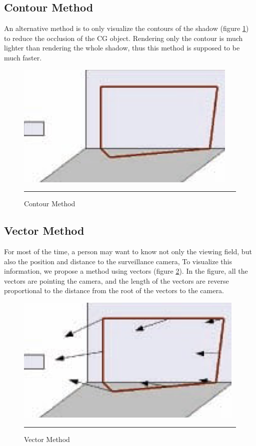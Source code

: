 \subsection{Contour Method}

An alternative method is to only visualize the contours of the shadow (figure \ref{fig:ContourMethod}) to reduce the occlusion of the CG object. Rendering only the contour is much lighter than rendering the whole shadow, thus this method is supposed to be much faster.

\begin{figure}[htbp]
	\centering
	\includegraphics{./Primitives/theory_contour.png}
	\rule{35em}{0.5pt}
	\caption[Contour Method]{Contour Method}
	\label{fig:ContourMethod}
\end{figure}

\subsection{Vector Method}

For most of the time, a person may want to know not only the viewing field, but also the position and distance to the surveillance camera, To visualize this information, we propose a method using vectors (figure \ref{fig:VectorMethod}). In the figure, all the vectors are pointing the camera, and the length of the vectors are reverse proportional to the distance from the root of the vectors to the camera.

\begin{figure}[htbp]
	\centering
	\includegraphics{./Primitives/theory_vector.png}
	\rule{35em}{0.5pt}
	\caption[Vector Method]{Vector Method}
	\label{fig:VectorMethod}
\end{figure}

